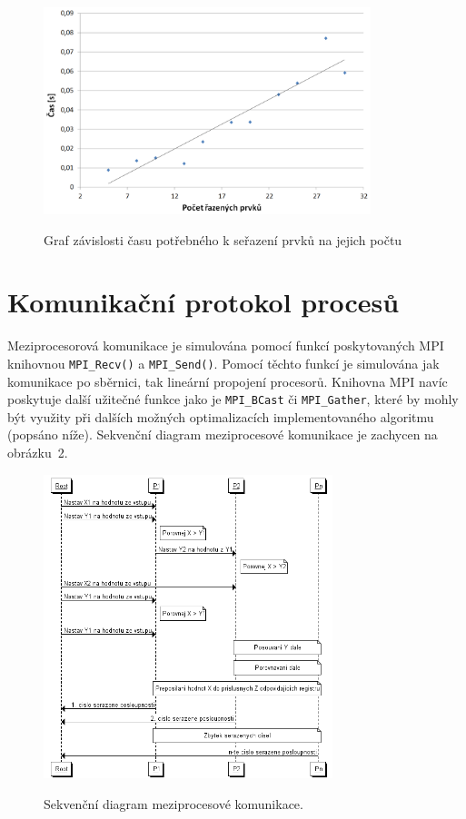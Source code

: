 \documentclass[a4paper,10pt]{article}
\begin{document}
	\begin{figure}[th]
	\centering
	\includegraphics[width=0.85\textwidth]{graph.PNG}
	\label{fig:graph}
	\caption{Graf závislosti času potřebného k seřazení prvků na jejich počtu}
	\end{figure}	


	\section{Komunikační protokol procesů}
	\label{sec:comprot}
    	\par Meziprocesorová komunikace je simulována pomocí funkcí poskytovaných MPI knihovnou \texttt{MPI\_Recv()} a \texttt{MPI\_Send()}. Pomocí těchto funkcí je simulována jak komunikace po sběrnici, tak lineární propojení procesorů. Knihovna MPI navíc poskytuje další užitečné funkce jako je \texttt{MPI\_BCast} či \texttt{MPI\_Gather}, které by mohly být využity při dalších možných optimalizacích implementovaného algoritmu (popsáno níže). Sekvenční diagram meziprocesové komunikace je zachycen na obrázku~2.

		\begin{figure}[h!]
    	\centering
    	\includegraphics[width=0.75\textwidth]{process_communication.png}
    	\label{fig:sequence-diagram}
    	\caption{Sekvenční diagram meziprocesové komunikace.}
    	\end{figure}
\end{document}
